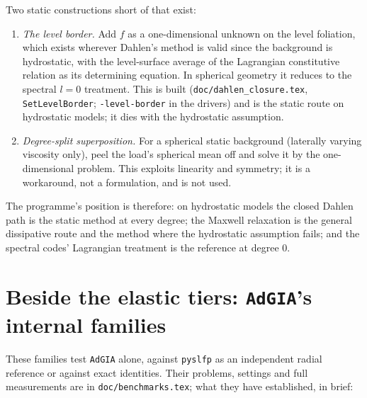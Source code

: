 \documentclass[11pt]{article}
\numberwithin{equation}{section}
\newcommand{\code}[1]{\texttt{#1}}
\begin{document}
Two static constructions short of that exist:
\begin{enumerate}[leftmargin=*,label=(\alph*)]
\item \emph{The level border.} Add $f$ as a one-dimensional unknown on
  the level foliation, which exists wherever Dahlen's method is valid
  since the background is hydrostatic, with the level-surface average of
  the Lagrangian constitutive relation as its determining equation. In
  spherical geometry it reduces to the spectral $l=0$ treatment. This is
  built (\code{doc/dahlen\_closure.tex}, \code{SetLevelBorder};
  \code{-level-border} in the drivers) and is the static route on
  hydrostatic models; it dies with the hydrostatic assumption.
\item \emph{Degree-split superposition.} For a spherical static background
  (laterally varying viscosity only), peel the load's spherical mean off
  and solve it by the one-dimensional problem. This exploits linearity and
  symmetry; it is a workaround, not a formulation, and is not used.
\end{enumerate}
The programme's position is therefore: on hydrostatic models the
closed Dahlen path is the static method at every degree; the Maxwell
relaxation is the general dissipative route and the method where the
hydrostatic assumption fails; and the spectral codes' Lagrangian
treatment is the reference at degree 0.

\section{Beside the elastic tiers: \code{AdGIA}'s internal families}
\label{sec:internal-elastic}

These families test \code{AdGIA} alone, against \code{pyslfp} as an
independent radial reference or against exact identities. Their problems,
settings and full measurements are in \code{doc/benchmarks.tex}; what they
have established, in brief:
\end{document}
